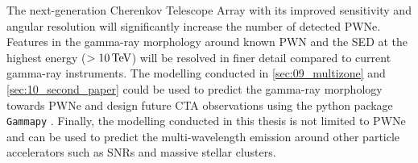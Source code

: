 \newpar
The next-generation Cherenkov Telescope Array with its improved sensitivity and angular resolution \citep{2019scta.book.....C} will significantly increase the number of detected PWNe. Features in the gamma-ray morphology around known PWN and the SED at the highest energy ($>10\,\TeV$) will be resolved in finer detail compared to current gamma-ray instruments. The modelling conducted in \autoref{sec:09_multizone} and \autoref{sec:10_second_paper} could be used to predict the gamma-ray morphology towards PWNe and design future CTA observations using the python package {\tt Gammapy} \citep{gammapy:2017}.
\newpar 
Finally, the modelling conducted in this thesis is not limited to PWNe and can be used to predict the multi-wavelength emission around other particle accelerators such as SNRs and massive stellar clusters.